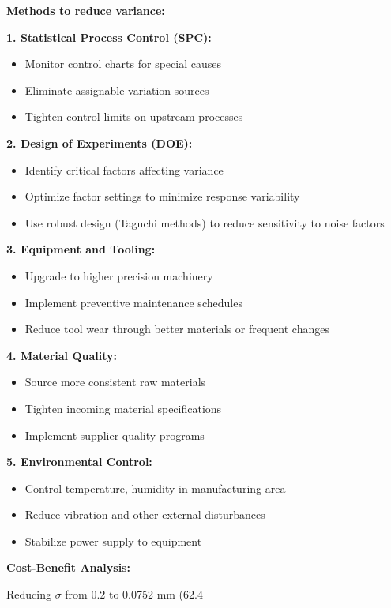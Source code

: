 \documentclass[12pt]{article}
\begin{document}
\begin{explanation}
\textbf{Methods to reduce variance:}

\textbf{1. Statistical Process Control (SPC):}
\begin{itemize}
    \item Monitor control charts for special causes
    \item Eliminate assignable variation sources
    \item Tighten control limits on upstream processes
\end{itemize}

\textbf{2. Design of Experiments (DOE):}
\begin{itemize}
    \item Identify critical factors affecting variance
    \item Optimize factor settings to minimize response variability
    \item Use robust design (Taguchi methods) to reduce sensitivity to noise factors
\end{itemize}

\textbf{3. Equipment and Tooling:}
\begin{itemize}
    \item Upgrade to higher precision machinery
    \item Implement preventive maintenance schedules
    \item Reduce tool wear through better materials or frequent changes
\end{itemize}

\textbf{4. Material Quality:}
\begin{itemize}
    \item Source more consistent raw materials
    \item Tighten incoming material specifications
    \item Implement supplier quality programs
\end{itemize}

\textbf{5. Environmental Control:}
\begin{itemize}
    \item Control temperature, humidity in manufacturing area
    \item Reduce vibration and other external disturbances
    \item Stabilize power supply to equipment
\end{itemize}

\textbf{Cost-Benefit Analysis:}

Reducing $\sigma$ from 0.2 to 0.0752 mm (62.4%


\end{explanation}
\end{document}
